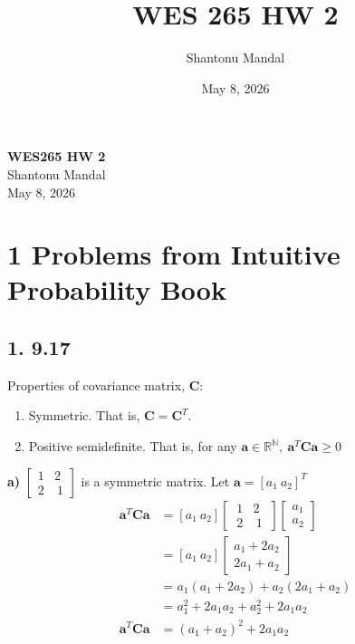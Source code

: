 \documentclass[12pt]{article}
\title{WES 265 HW 2}
\author{Shantonu Mandal}
\date{May 8, 2026}
\begin{document}
\begin{titlepage}
    \centering
    \vspace*{\fill}
    
    {\Huge \textbf{WES265 HW 2}} \\[0.5cm]
    {\Large Shantonu Mandal} \\[0.5cm]
    {\large May 8, 2026}
    
    \vspace*{\fill} %
\end{titlepage}
\newpage

\tableofcontents
\newpage

\section*{1 \quad Problems from Intuitive Probability Book}

\subsection*{1. 9.17}
\label{subsec:1.1}
Properties of covariance matrix, \textbf{C}:
\begin{enumerate}
  \item Symmetric. That is, $\mathbf{C} = \mathbf{C}^T$.
  \item Positive semidefinite. That is, for any $\mathbf{a} \in \mathbb{R^N},\ \mathbf{a}^T\textbf{C}\textbf{a}\geq 0$\\
\end{enumerate}

\noindent
\textbf{a)} $\begin{bmatrix}1 & 2 \\ 2 &\ 1\end{bmatrix}$ is a symmetric matrix. Let $\mathbf{a} = [a_1\ a_2]^T$\\
\noindent
\begin{align*}
  \mathbf{a}^T \mathbf{C} \mathbf{a} &= [a_1 \ a_2] \begin{bmatrix}\ 1 & 2 \\\ 2 &\ 1\ \end{bmatrix} \begin{bmatrix}a_1 \\ a_2 \end{bmatrix} \\[8pt]
  &= [a_1 \ a_2] \begin{bmatrix}a_1 + 2a_2 \\ 2a_1 + a_2\end{bmatrix} \\[8pt]
  &= a_1(a_1 + 2a_2) + a_2(2a_1 + a_2) \\[8pt]
  &= a_1^2 + 2a_1a_2 + a_2^2 + 2a_1a_2 \\[8pt]
  \mathbf{a}^T \mathbf{C} \mathbf{a} &= (a_1 + a_2)^2 + 2a_1a_2
\end{align*}
\end{document}
